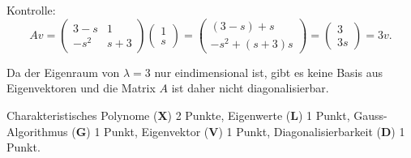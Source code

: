 \begin{loesung}
\begin{teilaufgaben}
Kontrolle:
\[
Av
=
\begin{pmatrix}
3-s &  1 \\
-s^2&s+3
\end{pmatrix}
\begin{pmatrix}1\\s\end{pmatrix}
=
\begin{pmatrix}
(3-s)+s\\
-s^2+(s+3)s
\end{pmatrix}
=
\begin{pmatrix}
3\\
3s
\end{pmatrix}
=
3v.
\]
\item
Da der Eigenraum von $\lambda=3$ nur eindimensional ist, gibt es keine
Basis aus Eigenvektoren und die Matrix $A$ ist daher nicht diagonalisierbar.
\qedhere
\end{teilaufgaben}
\end{loesung}

\begin{bewertung}
Charakteristisches Polynome ({\bf X}) 2 Punkte,
Eigenwerte ({\bf L}) 1 Punkt,
Gauss-Algorithmus ({\bf G}) 1 Punkt,
Eigenvektor ({\bf V}) 1 Punkt,
Diagonalisierbarkeit ({\bf D}) 1 Punkt.
\end{bewertung}
